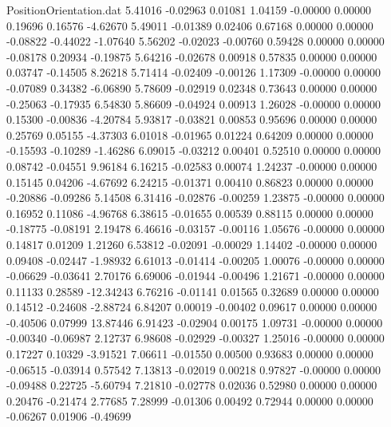 \begin{filecontents}{PositionOrientation.dat}
   5.41016   -0.02963    0.01081     1.04159   -0.00000    0.00000    0.19696    0.16576   -4.62670
   5.49011   -0.01389    0.02406     0.67168    0.00000    0.00000   -0.08822   -0.44022   -1.07640
   5.56202   -0.02023   -0.00760     0.59428    0.00000    0.00000   -0.08178    0.20934   -0.19875
   5.64216   -0.02678    0.00918     0.57835    0.00000    0.00000    0.03747   -0.14505    8.26218
   5.71414   -0.02409   -0.00126     1.17309   -0.00000    0.00000   -0.07089    0.34382   -6.06890
   5.78609   -0.02919    0.02348     0.73643    0.00000    0.00000   -0.25063   -0.17935    6.54830
   5.86609   -0.04924    0.00913     1.26028   -0.00000    0.00000    0.15300   -0.00836   -4.20784
   5.93817   -0.03821    0.00853     0.95696    0.00000    0.00000    0.25769    0.05155   -4.37303
   6.01018   -0.01965    0.01224     0.64209    0.00000    0.00000   -0.15593   -0.10289   -1.46286
   6.09015   -0.03212    0.00401     0.52510    0.00000    0.00000    0.08742   -0.04551    9.96184
   6.16215   -0.02583    0.00074     1.24237   -0.00000    0.00000    0.15145    0.04206   -4.67692
   6.24215   -0.01371    0.00410     0.86823    0.00000    0.00000   -0.20886   -0.09286    5.14508
   6.31416   -0.02876   -0.00259     1.23875   -0.00000    0.00000    0.16952    0.11086   -4.96768
   6.38615   -0.01655    0.00539     0.88115    0.00000    0.00000   -0.18775   -0.08191    2.19478
   6.46616   -0.03157   -0.00116     1.05676   -0.00000    0.00000    0.14817    0.01209    1.21260
   6.53812   -0.02091   -0.00029     1.14402   -0.00000    0.00000    0.09408   -0.02447   -1.98932
   6.61013   -0.01414   -0.00205     1.00076   -0.00000    0.00000   -0.06629   -0.03641    2.70176
   6.69006   -0.01944   -0.00496     1.21671   -0.00000    0.00000    0.11133    0.28589  -12.34243
   6.76216   -0.01141    0.01565     0.32689    0.00000    0.00000    0.14512   -0.24608   -2.88724
   6.84207    0.00019   -0.00402     0.09617    0.00000    0.00000   -0.40506    0.07999   13.87446
   6.91423   -0.02904    0.00175     1.09731   -0.00000    0.00000   -0.00340   -0.06987    2.12737
   6.98608   -0.02929   -0.00327     1.25016   -0.00000    0.00000    0.17227    0.10329   -3.91521
   7.06611   -0.01550    0.00500     0.93683    0.00000    0.00000   -0.06515   -0.03914    0.57542
   7.13813   -0.02019    0.00218     0.97827   -0.00000    0.00000   -0.09488    0.22725   -5.60794
   7.21810   -0.02778    0.02036     0.52980    0.00000    0.00000    0.20476   -0.21474    2.77685
   7.28999   -0.01306    0.00492     0.72944    0.00000    0.00000   -0.06267    0.01906   -0.49699

\end{filecontents}

